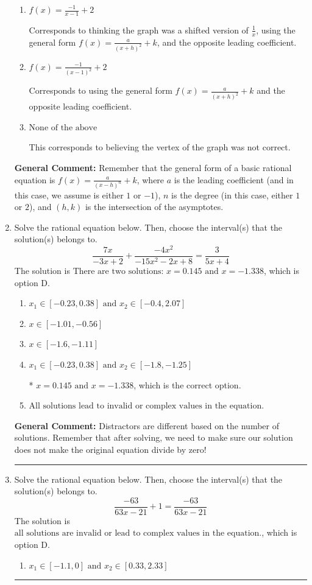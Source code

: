 \documentclass{extbook}[14pt]
\newcommand{\litem}[1]{\item #1

\rule{\textwidth}{0.4pt}}
\begin{document}
\begin{enumerate}
{\begin{enumerate}[label=\Alph*.]
Corresponds to thinking the graph was a shifted version of $\frac{1}{x}$.
\item \( f(x) = \frac{-1}{x - 1} + 2 \)

Corresponds to thinking the graph was a shifted version of $\frac{1}{x}$, using the general form $f(x) = \frac{a}{(x+h)^2}+k$, and the opposite leading coefficient.
\item \( f(x) = \frac{-1}{(x - 1)^2} + 2 \)

Corresponds to using the general form $f(x) = \frac{a}{(x+h)^2}+k$ and the opposite leading coefficient.
\item \( \text{None of the above} \)

This corresponds to believing the vertex of the graph was not correct.
\end{enumerate}

\textbf{General Comment:} Remember that the general form of a basic rational equation is $ f(x) = \frac{a}{(x-h)^n} + k$, where $a$ is the leading coefficient (and in this case, we assume is either $1$ or $-1$), $n$ is the degree (in this case, either $1$ or $2$), and $(h, k)$ is the intersection of the asymptotes.
}
\litem{
Solve the rational equation below. Then, choose the interval(s) that the solution(s) belongs to.
\[ \frac{7x}{-3x + 2} + \frac{-4x^{2}}{-15x^{2} -2 x + 8} = \frac{3}{5x + 4} \]The solution is \( \text{There are two solutions: } x = 0.145 \text{ and } x = -1.338 \), which is option D.\begin{enumerate}[label=\Alph*.]
\item \( x_1 \in [-0.23, 0.38] \text{ and } x_2 \in [-0.4,2.07] \)


\item \( x \in [-1.01,-0.56] \)


\item \( x \in [-1.6,-1.11] \)


\item \( x_1 \in [-0.23, 0.38] \text{ and } x_2 \in [-1.8,-1.25] \)

* $x = 0.145 \text{ and } x = -1.338$, which is the correct option.
\item \( \text{All solutions lead to invalid or complex values in the equation.} \)


\end{enumerate}

\textbf{General Comment:} Distractors are different based on the number of solutions. Remember that after solving, we need to make sure our solution does not make the original equation divide by zero!
}
\litem{
Solve the rational equation below. Then, choose the interval(s) that the solution(s) belongs to.
\[ \frac{-63}{63x -21} + 1 = \frac{-63}{63x -21} \]The solution is \( \text{all solutions are invalid or lead to complex values in the equation.} \), which is option D.\begin{enumerate}[label=\Alph*.]
\item \( x_1 \in [-1.1, 0] \text{ and } x_2 \in [0.33,2.33] \)


\end{enumerate}}
\end{enumerate}
\end{document}
